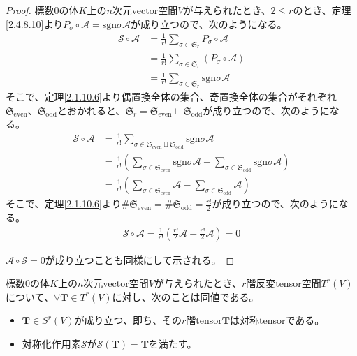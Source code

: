 \documentclass[dvipdfmx]{jsarticle}
\begin{document}
\begin{proof}
標数$0$の体$K$上の$n$次元vector空間$V$が与えられたとき、$2 \leq r$のとき、定理\ref{2.4.8.10}より$P_{\sigma} \circ \mathcal{A} =\mathrm{sgn}\sigma\mathcal{A}$が成り立つので、次のようになる。
\begin{align*}
\mathcal{S \circ A} &= \frac{1}{r!}\sum_{\sigma \in \mathfrak{S}_{r}} P_{\sigma}\circ \mathcal{A}\\
&= \frac{1}{r!}\sum_{\sigma \in \mathfrak{S}_{r}} \left( P_{\sigma}\circ \mathcal{A} \right)\\
&= \frac{1}{r!}\sum_{\sigma \in \mathfrak{S}_{r}} {\mathrm{sgn}\sigma\mathcal{A}}
\end{align*}
そこで、定理\ref{2.1.10.6}より偶置換全体の集合、奇置換全体の集合がそれぞれ$\mathfrak{S}_{\mathrm{even}}$、$\mathfrak{S}_{\mathrm{odd}}$とおかれると、$\mathfrak{S}_{r} = \mathfrak{S}_{\mathrm{even}} \sqcup \mathfrak{S}_{\mathrm{odd}}$が成り立つので、次のようになる。
\begin{align*}
\mathcal{S \circ A} &= \frac{1}{r!}\sum_{\sigma \in \mathfrak{S}_{\mathrm{even}} \sqcup \mathfrak{S}_{\mathrm{odd}}} {\mathrm{sgn}\sigma\mathcal{A}}\\
&= \frac{1}{r!}\left( \sum_{\sigma \in \mathfrak{S}_{\mathrm{even}}} {\mathrm{sgn}\sigma\mathcal{A}} + \sum_{\sigma \in \mathfrak{S}_{\mathrm{odd}}} {\mathrm{sgn}\sigma\mathcal{A}} \right)\\
&= \frac{1}{r!}\left( \sum_{\sigma \in \mathfrak{S}_{\mathrm{even}}} \mathcal{A} - \sum_{\sigma \in \mathfrak{S}_{\mathrm{odd}}} \mathcal{A} \right)
\end{align*}
そこで、定理\ref{2.1.10.6}より${\#}\mathfrak{S}_{\mathrm{even}} = {\#}\mathfrak{S}_{\mathrm{odd}} = \frac{r!}{2}$が成り立つので、次のようになる。
\begin{align*}
\mathcal{S \circ A}=\frac{1}{r!}\left( \frac{r!}{2}\mathcal{A -}\frac{r!}{2}\mathcal{A} \right) = 0
\end{align*}\par
$\mathcal{A \circ S} = 0$が成り立つことも同様にして示される。
\end{proof}
\begin{thm}\label{2.4.8.12}
標数$0$の体$K$上の$n$次元vector空間$V$が与えられたとき、$r$階反変tensor空間$T^{r}(V)$について、$\forall\mathbf{T} \in T^{r}(V)$に対し、次のことは同値である。
\begin{itemize}
\item
  $\mathbf{T} \in S^{r}(V)$が成り立つ、即ち、その$r$階tensor$\mathbf{T}$は対称tensorである。
\item
  対称化作用素$\mathcal{S}$が$\mathcal{S}\left( \mathbf{T} \right) = \mathbf{T}$を満たす。
\end{itemize}
\end{thm}
\end{document}
